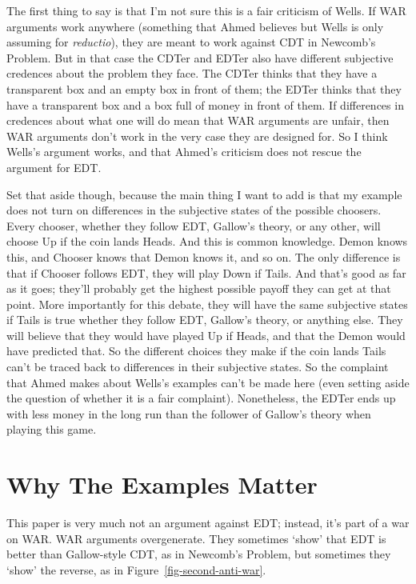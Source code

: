 \documentclass[
  11pt,
  letterpaper,
  DIV=11,
  numbers=noendperiod,
  twoside]{scrartcl}
\begin{document}
The first thing to say is that I'm not sure this is a fair criticism of
Wells. If WAR arguments work anywhere (something that Ahmed believes but
Wells is only assuming for \emph{reductio}), they are meant to work
against CDT in Newcomb's Problem. But in that case the CDTer and EDTer
also have different subjective credences about the problem they face.
The CDTer thinks that they have a transparent box and an empty box in
front of them; the EDTer thinks that they have a transparent box and a
box full of money in front of them. If differences in credences about
what one will do mean that WAR arguments are unfair, then WAR arguments
don't work in the very case they are designed for. So I think Wells's
argument works, and that Ahmed's criticism does not rescue the argument
for EDT.

Set that aside though, because the main thing I want to add is that my
example does not turn on differences in the subjective states of the
possible choosers. Every chooser, whether they follow EDT, Gallow's
theory, or any other, will choose Up if the coin lands Heads. And this
is common knowledge. Demon knows this, and Chooser knows that Demon
knows it, and so on. The only difference is that if Chooser follows EDT,
they will play Down if Tails. And that's good as far as it goes; they'll
probably get the highest possible payoff they can get at that point.
More importantly for this debate, they will have the same subjective
states if Tails is true whether they follow EDT, Gallow's theory, or
anything else. They will believe that they would have played Up if
Heads, and that the Demon would have predicted that. So the different
choices they make if the coin lands Tails can't be traced back to
differences in their subjective states. So the complaint that Ahmed
makes about Wells's examples can't be made here (even setting aside the
question of whether it is a fair complaint). Nonetheless, the EDTer ends
up with less money in the long run than the follower of Gallow's theory
when playing this game.

\section{Why The Examples Matter}\label{why-the-examples-matter}

This paper is very much not an argument against EDT; instead, it's part
of a war on WAR. WAR arguments overgenerate. They sometimes `show' that
EDT is better than Gallow-style CDT, as in Newcomb's Problem, but
sometimes they `show' the reverse, as in
Figure~\ref{fig-second-anti-war}.
\end{document}
